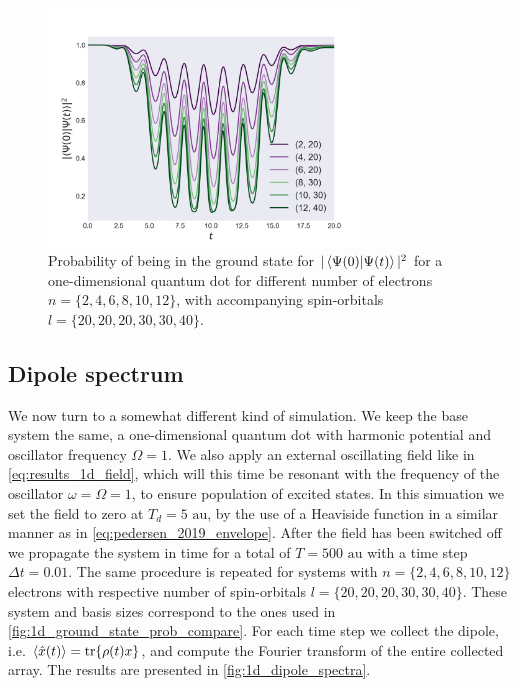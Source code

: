 \begin{figure}
    \centering
    \includegraphics[width=0.75\textwidth]{results/figures/1D/n_compare_overlap.png} 
    \caption{Probability of being in the ground state for $|\braket*{\Psi(0)}{\Psi(t)}|^2$
        for a one-dimensional quantum dot for different number of electrons 
        $n = \{2,4,6,8,10,12\}$, with accompanying spin-orbitals $l=\{20,20,20,30,30,40\}$.
    }
    \label{fig:1d_ground_state_prob_compare}
\end{figure}

\subsection{Dipole spectrum}

We now turn to a somewhat different kind of simulation. We keep the 
base system the same, a one-dimensional quantum dot with harmonic potential and oscillator 
frequency $\Omega=1$. We also apply an external oscillating field like in
\autoref{eq:results_1d_field}, which will this time be resonant with the frequency of the 
oscillator $\omega=\Omega=1$, to ensure population of excited states. In this simuation 
we set the field to zero at $T_d = 5 \text{ au}$, by the use of a Heaviside function in a 
similar manner as \citeauthor{pedersen2019symplectic}\cite{pedersen2019symplectic}
in \autoref{eq:pedersen_2019_envelope}. After the field has been switched off we propagate 
the system in time for a total of $T = 500 \text{ au}$ with a time step $\Delta t=0.01$.
The same procedure is repeated for systems with $n=\{2,4,6,8,10,12\}$ electrons with 
respective number of spin-orbitals $l=\{20,20,20,30,30,40\}$. These system and basis 
sizes correspond to the ones used in \autoref{fig:1d_ground_state_prob_compare}.
For each time step we collect the dipole, i.e. $\ev{\hat{x}(t)} = \tr{\rho(t) x}$, and compute the 
Fourier transform of the entire collected array. The results are presented in 
\autoref{fig:1d_dipole_spectra}.

